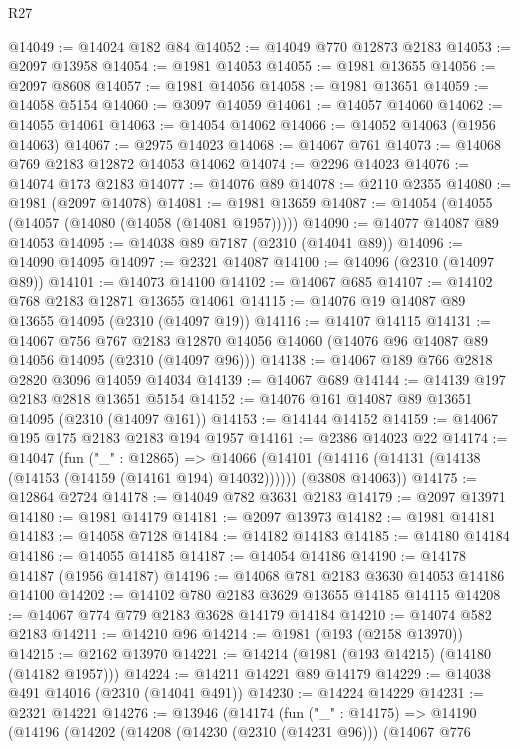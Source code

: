 \begin{lexlean}{R27}
\begin{coremodule}
@14049 := @14024 @182 @84
@14052 := @14049 @770 @12873 @2183
@14053 := @2097 @13958
@14054 := @1981 @14053
@14055 := @1981 @13655
@14056 := @2097 @8608
@14057 := @1981 @14056
@14058 := @1981 @13651
@14059 := @14058 @5154
@14060 := @3097 @14059
@14061 := @14057 @14060
@14062 := @14055 @14061
@14063 := @14054 @14062
@14066 := @14052 @14063 (@1956 @14063)
@14067 := @2975 @14023
@14068 := @14067 @761
@14073 := @14068 @769 @2183 @12872 @14053 @14062
@14074 := @2296 @14023
@14076 := @14074 @173 @2183
@14077 := @14076 @89
@14078 := @2110 @2355
@14080 := @1981 (@2097 @14078)
@14081 := @1981 @13659
@14087 := @14054 (@14055 (@14057 (@14080 (@14058 (@14081 @1957)))))
@14090 := @14077 @14087 @89 @14053
@14095 := @14038 @89 @7187 (@2310 (@14041 @89))
@14096 := @14090 @14095
@14097 := @2321 @14087
@14100 := @14096 (@2310 (@14097 @89))
@14101 := @14073 @14100
@14102 := @14067 @685
@14107 := @14102 @768 @2183 @12871 @13655 @14061
@14115 := @14076 @19 @14087 @89 @13655 @14095 (@2310 (@14097 @19))
@14116 := @14107 @14115
@14131 := @14067
    @756
    @767
    @2183
    @12870
    @14056
    @14060
    (@14076 @96 @14087 @89 @14056 @14095 (@2310 (@14097 @96)))
@14138 := @14067 @189 @766 @2818 @2820 @3096 @14059 @14034
@14139 := @14067 @689
@14144 := @14139 @197 @2183 @2818 @13651 @5154
@14152 := @14076 @161 @14087 @89 @13651 @14095 (@2310 (@14097 @161))
@14153 := @14144 @14152
@14159 := @14067 @195 @175 @2183 @2183 @194 @1957
@14161 := @2386 @14023 @22
@14174 := @14047
    (fun ("_" : @12865) =>
    @14066
      (@14101 (@14116 (@14131 (@14138 (@14153 (@14159 (@14161 @194) @14032))))))
      (@3808 @14063))
@14175 := @12864 @2724
@14178 := @14049 @782 @3631 @2183
@14179 := @2097 @13971
@14180 := @1981 @14179
@14181 := @2097 @13973
@14182 := @1981 @14181
@14183 := @14058 @7128
@14184 := @14182 @14183
@14185 := @14180 @14184
@14186 := @14055 @14185
@14187 := @14054 @14186
@14190 := @14178 @14187 (@1956 @14187)
@14196 := @14068 @781 @2183 @3630 @14053 @14186 @14100
@14202 := @14102 @780 @2183 @3629 @13655 @14185 @14115
@14208 := @14067 @774 @779 @2183 @3628 @14179 @14184
@14210 := @14074 @582 @2183
@14211 := @14210 @96
@14214 := @1981 (@193 (@2158 @13970))
@14215 := @2162 @13970
@14221 := @14214 (@1981 (@193 @14215) (@14180 (@14182 @1957)))
@14224 := @14211 @14221 @89 @14179
@14229 := @14038 @491 @14016 (@2310 (@14041 @491))
@14230 := @14224 @14229
@14231 := @2321 @14221
@14276 := @13946
    (@14174
      (fun ("_" : @14175) =>
      @14190
        (@14196
          (@14202
            (@14208
              (@14230 (@2310 (@14231 @96)))
              (@14067
                @776

\end{coremodule}
\end{lexlean}
